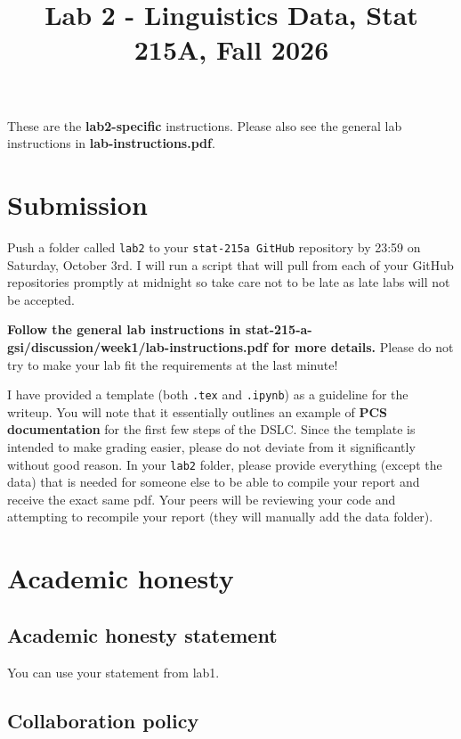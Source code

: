 \documentclass[letterpaper,12pt]{article}
\title{Lab 2 - Linguistics Data, Stat 215A, Fall 2026\vspace{-2em}}
\begin{document}
\maketitle

These are the \textbf{lab2-specific} instructions. Please also see the general lab instructions in \textbf{lab-instructions.pdf}.

\tableofcontents

\section{Submission}
Push a folder called \texttt{lab2} to your \texttt{stat-215a GitHub} repository by 23:59 on Saturday, October 3rd. I will run a script that will pull from each of your GitHub repositories promptly at midnight so take care not to be late as late labs will not be accepted.

\textbf{Follow the general lab instructions in stat-215-a-gsi/discussion/week1/lab-instructions.pdf for more details.} Please do not try to make your lab fit the requirements at the last minute!

I have provided a template (both \texttt{.tex} and \texttt{.ipynb}) as a guideline for the writeup. You will note that it essentially outlines an example of \textbf{PCS documentation} for the first few steps of the DSLC. Since the template is intended to make grading easier, please do not deviate from it significantly without good reason. In your \texttt{lab2} folder, please provide everything (except the data) that is needed for someone else to be able to compile your report and receive the exact same pdf. Your peers will be reviewing your code and attempting to recompile your report (they will manually add the data folder).

\section{Academic honesty}

\subsection{Academic honesty statement}

You can use your statement from lab1.

\subsection{Collaboration policy}
\end{document}
